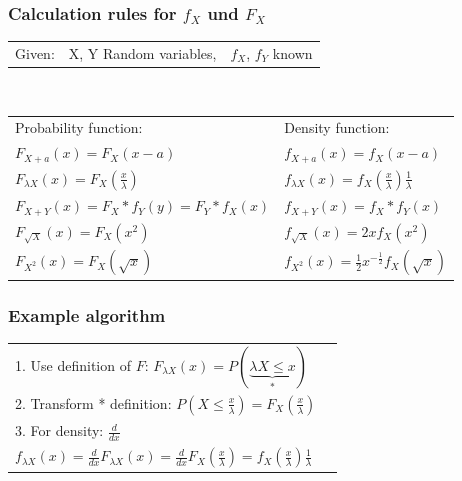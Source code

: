 	\subsubsection{Calculation rules for $f_X$ und $F_X$}
		\begin{minipage}{11cm}
			\begin{tabular}{lll}
        	Given: & X, Y Random variables, 
        	&$f_X$, $f_Y$ known\\
        	\end{tabular}\\
 
        	\begin{tabular}{p{6cm}p{6cm}}
        	Probability function: & Density function:\\
        	$F_{X+a}(x)=F_X(x-a)$  &$f_{X+a}(x)=f_X(x-a)$\\
        	$F_{\lambda X}(x)=F_X(\frac{x}{\lambda})$ &$f_{\lambda
        	X}(x)=f_X(\frac{x}{\lambda})\frac{1}{\lambda}$\\
        	$F_{X+Y}(x)=F_X\ast f_Y(y)=F_Y\ast f_X(x)$ &
        	$f_{X+Y}(x)=f_X\ast f_Y(x)$\\
        	$F_{\sqrt{X}}(x)=F_X(x^2)$ &
        	$f_{\sqrt{X}}(x)=2x f_X(x^2)$\\
        	$F_{X^2}(x)=F_X(\sqrt{x})$ &
        	$f_{X^2}(x)=\frac{1}{2}x^{-\frac{1}{2}}f_X(\sqrt{x})$
        	\end{tabular}
		\end{minipage}
		\begin{minipage}{7cm}
        	\subsubsection{Example algorithm}
        	\begin{tabular}{ll}
        	1. Use definition of $F$: $F_{\lambda X}(x)=P(\underbrace
        	{\lambda X\leq x}_{*})$\\[0.5cm]
        	2. Transform * definition: $P(X \leq
        	\frac{x}{\lambda})=F_X(\frac{x}{\lambda})$\\[0.5cm]
        	3. For density: $\frac{d}{dx}$\\[0.5cm]
        	$f_{\lambda X}(x)=\frac{d}{dx}F_{\lambda
        	X}(x)=\frac{d}{dx}F_X(\frac{x}{\lambda})=
        	f_X(\frac{x}{\lambda})\frac{1}{\lambda}$
        	\end{tabular}
			\vspace{10mm}
        \end{minipage}
        
